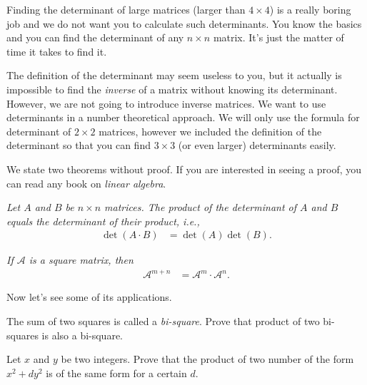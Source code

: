 \documentclass{subfile}
\begin{document}
Finding the determinant of large matrices (larger than $4 \times 4$) is a really boring job and we do not want you to calculate such determinants. You know the basics and you can find the determinant of any $n\times n$ matrix. It's just the matter of time it takes to find it.

The definition of the determinant may seem useless to you, but it actually is impossible to find the \textit{inverse} of a matrix without knowing its determinant. However, we are not going to introduce inverse matrices. We want to use determinants in a number theoretical approach. We will only use the formula for determinant of $2 \times 2$ matrices, however we included the definition of the determinant so that you can find $3 \times 3$ (or even larger) determinants easily.

We state two theorems without proof. If you are interested in seeing a proof, you can read any book on \textit{linear algebra}.

	\begin{theorem}\slshape
	Let $A$ and $B$ be $n\times n$ matrices. The product of the determinant of $A$ and $B$ equals the determinant of their product, i.e.,
		\begin{align*}
			\det(A \cdot B)
				& =\det(A)\det(B).
		\end{align*}
	\end{theorem}


\begin{theorem}\slshape
If $\mathcal A$ is a square matrix, then
	\begin{align*}
		\mathcal A^{m+n}
			& =\mathcal A^m \cdot \mathcal{A}^n.
	\end{align*}
\end{theorem}

Now let's see some of its applications.

\begin{problem}
The sum of two squares is called a \textit{bi-square}. Prove that product of two bi-squares is also a bi-square.
\end{problem}

\begin{problem}
Let $x$ and $y$ be two integers. Prove that the product of two number of the form $x^2+dy^2$ is of the same form for a  certain $d$.
\end{problem}
\end{document}
